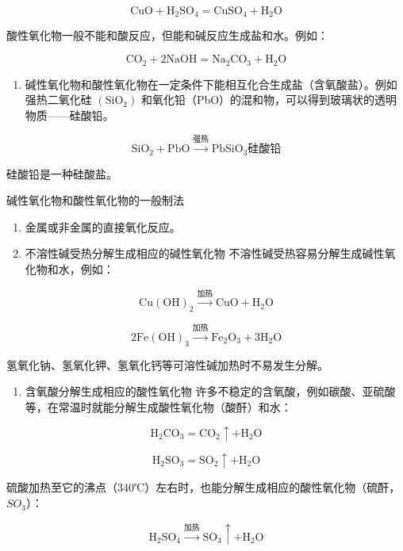 \[
\mathrm{CuO} + \mathrm{H}_{2} \mathrm{SO}_{4} = \mathrm{CuSO}_{4} + \mathrm{H}_{2} \mathrm{O}
\]

酸性氧化物一般不能和酸反应，但能和碱反应生成盐和水。例如：

\[
\mathrm{CO}_{2} + 2 \mathrm{NaOH} = \mathrm{Na}_{2} \mathrm{CO}_{3} + \mathrm{H}_{2} \mathrm{O}
\]

\begin{enumerate}[start=3]
\item
  碱性氧化物和酸性氧化物在一定条件下能相互化合生成盐（含氧酸盐）。例如强热二氧化硅
  \(\left(\mathrm{SiO}_{2}\right)\)
  和氧化铅（PbO）的混和物，可以得到玻璃状的透明物质------硅酸铅。
\end{enumerate}

\[
\mathrm{SiO}_{2} + \mathrm{PbO} \xrightarrow {\text{强热}} \mathrm{PbSiO}_{3} \text{硅酸铅}
\]

硅酸铅是一种硅酸盐。

碱性氧化物和酸性氧化物的一般制法

\begin{enumerate}
\item
  金属或非金属的直接氧化反应。
\item
  不溶性碱受热分解生成相应的碱性氧化物
  不溶性碱受热容易分解生成碱性氧化物和水，例如：
\end{enumerate}

\[
\mathrm{Cu(OH)}_{2} \xrightarrow {\text{加热}} \mathrm{CuO} + \mathrm{H}_{2} \mathrm{O}
\]

\[
2 \mathrm{Fe(OH)}_{3} \xrightarrow {\text{加热}} \mathrm{Fe}_{2} \mathrm{O}_{3} + 3 \mathrm{H}_{2} \mathrm{O}
\]

氢氧化钠、氢氧化钾、氢氧化钙等可溶性碱加热时不易发生分解。

\begin{enumerate}[start=3]
\item
  含氧酸分解生成相应的酸性氧化物
  许多不稳定的含氧酸，例如碳酸、亚硫酸等，在常温时就能分解生成酸性氧化物（酸酐）和水：
\end{enumerate}

\[
\mathrm{H}_{2} \mathrm{CO}_{3} = \mathrm{CO}_{2} \uparrow + \mathrm{H}_{2} \mathrm{O}
\]

\[
\mathrm{H}_{2} \mathrm{SO}_{3} = \mathrm{SO}_{2} \uparrow + \mathrm{H}_{2} \mathrm{O}
\]

硫酸加热至它的沸点（340℃）左右时，也能分解生成相应的酸性氧化物（硫酐，
\(SO_{3}\)）：

\[
\mathrm{H}_{2} \mathrm{SO}_{4} \xrightarrow {\text{加热}} \mathrm{SO}_{3} \uparrow + \mathrm{H}_{2} \mathrm{O}
\]

